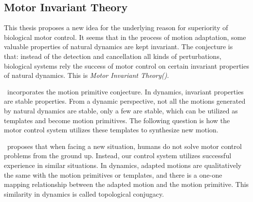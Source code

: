 \subsection{Motor Invariant Theory}
%
%
%





This thesis proposes a new idea for the underlying reason for superiority of biological motor control.
It seems  that in the process of motion adaptation, some valuable properties of natural dynamics are kept invariant.
The conjecture is that:  instead of the detection and cancellation all kinds of perturbations, biological systems rely the success of motor control on  certain invariant properties of natural dynamics. 
This is \emph{Motor Invariant Theory({\moit})}.


{\moit}\ incorporates the motion primitive conjecture.
In dynamics, invariant properties are stable properties.
From a dynamic perspective, not all the motions generated by natural dynamics are stable, only a few are stable, which can be utilized as templates and become motion primitives.
The following question is how the motor control system utilizes these templates to synthesize new motion.

{\moit}\ proposes that when facing a new situation, humans do not solve motor control problems from the ground up.
Instead, our control system utilizes successful experience in similar situations.
In dynamics, adapted motions are qualitatively the same with the motion primitives or templates, and there is a one-one mapping relationship between the adapted motion and the motion primitive.
This similarity in dynamics is called topological conjugacy. 

